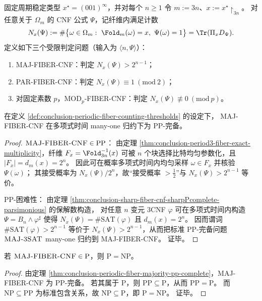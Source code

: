 \begin{definition}[固定周期三纤维上的多数与模计数判定]\label{def:conclusion-periodic-fiber-counting-thresholds}
固定周期稳定类型 \(x^\star=(001)^\infty\)，并对每个 \(n\ge 1\) 令 \(m:=3n\)、\(x:=x^\star\!\upharpoonright_{3n}\)。
对任意关于 \(\Omega_m\) 的 CNF 公式 \(\Psi\)，记纤维内满足计数
\[
N_x(\Psi):=\#\bigl\{\omega\in\Omega_m:\ \Fold_m(\omega)=x,\ \Psi(\omega)=1\bigr\}
=\Tr(\Pi_xD_\Psi).
\]
定义如下三个受限判定问题（输入为 \(\langle n,\Psi\rangle\)）：
\begin{enumerate}
  \item \textsc{MAJ-FIBER-CNF}：判定 \(N_x(\Psi)>2^{n-1}\)；
  \item \textsc{PAR-FIBER-CNF}：判定 \(N_x(\Psi)\equiv 1\ (\mathrm{mod}\ 2)\)；
  \item 对固定素数 \(p\)，\textsc{MOD}\(_p\)\textsc{-FIBER-CNF}：判定 \(N_x(\Psi)\not\equiv 0\ (\mathrm{mod}\ p)\)。
\end{enumerate}
\end{definition}

\begin{theorem}\label{thm:conclusion-periodic-fiber-majority-pp-complete}
在定义 \ref{def:conclusion-periodic-fiber-counting-thresholds} 的设定下，
{\normalfont\textsc{MAJ-FIBER-CNF}} 在多项式时间 many-one 归约下为 \(\mathrm{PP}\)-完备。
\end{theorem}
\begin{proof}
\(\textsc{MAJ-FIBER-CNF}\in\mathrm{PP}\)：
由定理 \ref{thm:conclusion-period3-fiber-exact-multiplicity}，纤维 \(F_x=\Fold_{3n}^{-1}(x)\) 可被 \(n\) 个块选择比特均匀参数化，且 \(|F_x|=d_m(x)=2^n\)。
因此可在概率多项式时间内均匀采样 \(\omega\in F_x\) 并核验 \(\Psi(\omega)\)；
其接受概率为 \(N_x(\Psi)/2^n\)，故“接受概率 \(>\tfrac12\)”与 \(N_x(\Psi)>2^{n-1}\) 等价。
\par
\(\mathrm{PP}\)-困难性：
由定理 \ref{thm:conclusion-sharp-fiber-cnf-sharpPcomplete-parsimonious} 的保解数构造，
对任意 \(n\) 变元 3CNF \(\varphi\) 可在多项式时间内构造 \(\Psi=B_n\wedge\varphi^\sharp\) 使得
\(
N_x(\Psi)=\#\mathrm{SAT}(\varphi)
\)
且 \(d_m(x)=2^n\)。
因而谓词 \(\#\mathrm{SAT}(\varphi)>2^{n-1}\) 等价于 \(N_x(\Psi)>2^{n-1}\)，从而把标准 \(\mathrm{PP}\)-完备问题 \(\textsc{MAJ-3SAT}\) many-one 归约到 \textsc{MAJ-FIBER-CNF}。
证毕。
\end{proof}

\begin{corollary}[多数判定的多项式可解性蕴含 \texorpdfstring{\(\mathrm{P}=\mathrm{NP}\)}{P=NP}]\label{cor:conclusion-periodic-fiber-majority-p-implies-pnp}
若 \(\text{\normalfont\textsc{MAJ-FIBER-CNF}}\in \mathrm{P}\)，则 \(\mathrm{P}=\mathrm{NP}\)。
\end{corollary}
\begin{proof}
由定理 \ref{thm:conclusion-periodic-fiber-majority-pp-complete}，\textsc{MAJ-FIBER-CNF} 为 \(\mathrm{PP}\)-完备。
若其属于 \(\mathrm{P}\)，则 \(\mathrm{PP}\subseteq \mathrm{P}\)，从而 \(\mathrm{PP}=\mathrm{P}\)。
而 \(\mathrm{NP}\subseteq \mathrm{PP}\) 为标准包含关系，故 \(\mathrm{NP}\subseteq \mathrm{P}\)，即 \(\mathrm{P}=\mathrm{NP}\)。
证毕。
\end{proof}

